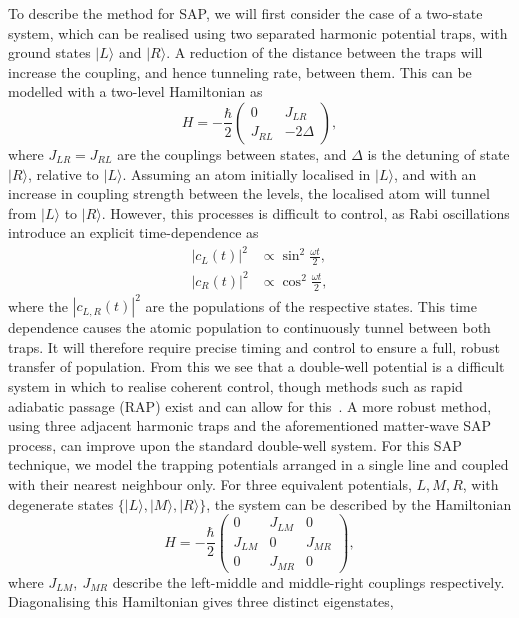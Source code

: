 To describe the method for SAP, we will first consider the case of a two-state system, which can be realised using two separated harmonic potential traps, with ground states $| L \rangle$ and $| R \rangle$. A reduction of the distance between the traps will increase the coupling, and hence tunneling rate, between them. This can be modelled with a two-level Hamiltonian as
\begin{equation}
    H = -\frac{\hbar}{2}
    \begin{pmatrix}
        0 & J_{LR} \\
        J_{RL} & -2\Delta
    \end{pmatrix},
\end{equation}
where $J_{LR} = J_{RL}$ are the couplings between states, and $\Delta$ is the detuning of state $| R \rangle$, relative to $| L \rangle$. Assuming an atom initially localised in $| L \rangle$, and with an increase in coupling strength between the levels, the localised atom will tunnel from $| L \rangle$ to $| R \rangle $. However, this processes is difficult to control, as Rabi oscillations introduce an explicit time-dependence as
\begin{subequations}
\begin{align}
    |c_L(t)|^2 &\propto \sin^2 \frac{\omega t}{2} ,\\
    |c_R(t)|^2 &\propto \cos^2 \frac{\omega t}{2},
\end{align}
\end{subequations}
where the $|c_{L,R}(t)|^2$ are the populations of the respective states. This time dependence causes the atomic population to continuously tunnel between both traps. It will therefore require precise timing and control to ensure a full, robust transfer of population. From this we see that a double-well potential is a difficult system in which to realise coherent control, though methods such as rapid adiabatic passage (RAP) exist and can allow for this~\cite{AO:Vitanov_arpc_2001}. A more robust method, using three adjacent harmonic traps and the aforementioned matter-wave SAP process, can improve upon the standard double-well system. For this SAP technique, we model the trapping potentials arranged in a single line and coupled with their nearest neighbour only. For three equivalent potentials, $L,M,R$, with degenerate states $\{|L \rangle,|M\rangle,|R\rangle\}$, the system can be described by the Hamiltonian
\begin{equation}\label{eqn:sap_ham}
    H = -\frac{\hbar}{2}
    \begin{pmatrix}
        0 & J_{LM} & 0 \\
        J_{LM} & 0 & J_{MR} \\
        0 & J_{MR} & 0
    \end{pmatrix},
\end{equation}
where $J_{LM},~J_{MR}$ describe the left-middle and middle-right couplings respectively. Diagonalising this Hamiltonian gives three distinct eigenstates,

